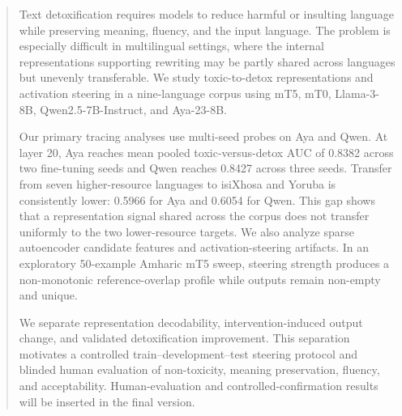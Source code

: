 \begin{abstract}
Text detoxification requires models to reduce harmful or insulting language while
preserving meaning, fluency, and the input language. The problem is especially
difficult in multilingual settings, where the internal representations supporting
rewriting may be partly shared across languages but unevenly transferable. We study
toxic-to-detox representations and activation steering in a nine-language corpus using
mT5, mT0, Llama-3-8B, Qwen2.5-7B-Instruct, and Aya-23-8B.

Our primary tracing analyses use multi-seed probes on Aya and Qwen. At layer 20, Aya
reaches mean pooled toxic-versus-detox AUC of 0.8382 across two fine-tuning seeds and
Qwen reaches 0.8427 across three seeds. Transfer from seven higher-resource languages
to isiXhosa and Yoruba is consistently lower: 0.5966 for Aya and 0.6054 for Qwen.
This gap shows that a representation signal shared across the corpus does not transfer
uniformly to the two lower-resource targets. We also analyze sparse autoencoder
candidate features and activation-steering artifacts. In an exploratory 50-example
Amharic mT5 sweep, steering strength produces a non-monotonic
reference-overlap profile while outputs remain non-empty and unique.

We separate representation decodability, intervention-induced output change, and
validated detoxification improvement. This separation motivates a controlled
train--development--test steering protocol and blinded human evaluation of
non-toxicity, meaning preservation, fluency, and acceptability. Human-evaluation and
controlled-confirmation results will be inserted in the final version.
\end{abstract}

